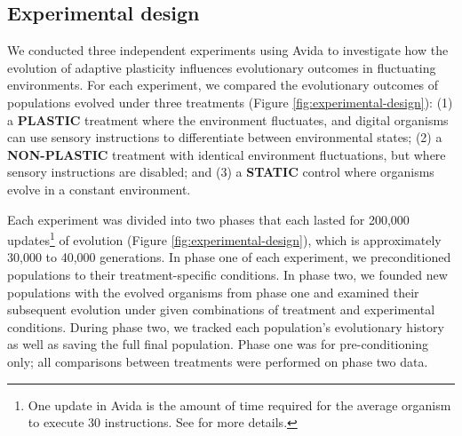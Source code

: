\subsection{Experimental design}
\label{sec:methods:experiment}




We conducted three independent experiments using Avida to investigate how the evolution of adaptive plasticity influences evolutionary outcomes in fluctuating environments.
For each experiment, we compared the evolutionary outcomes of populations evolved under three treatments (Figure \ref{fig:experimental-design}): 
(1) a \textbf{PLASTIC} treatment where the environment fluctuates, and digital organisms can use sensory instructions to differentiate between environmental states;
(2) a \textbf{NON-PLASTIC} treatment with identical environment fluctuations, but where sensory instructions are disabled;
and (3) a \textbf{STATIC} control where organisms evolve in a constant environment.

Each experiment was divided into two phases that each lasted for 200,000 updates\footnote{
    One update in Avida is the amount of time required for the average organism to execute 30 instructions. 
    See \citep{ofria_avida:_2009} for more details.
} of evolution (Figure \ref{fig:experimental-design}), which is approximately 30,000 to 40,000 generations.
In phase one of each experiment, we preconditioned populations to their treatment-specific conditions.
In phase two, we founded new populations with the evolved organisms from phase one and examined their subsequent evolution under given combinations of treatment and experimental conditions.
During phase two, we tracked each population's evolutionary history as well as saving the full final population.
Phase one was for pre-conditioning only; all comparisons between treatments were performed on phase two data.

\vspace{5mm}
